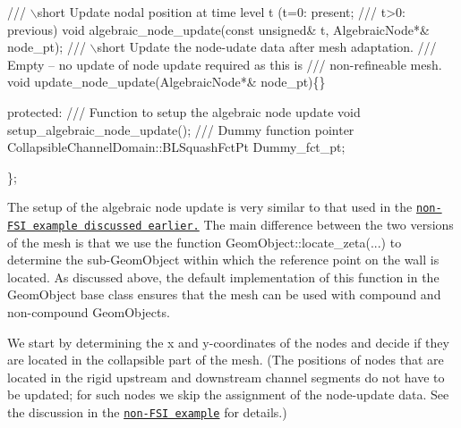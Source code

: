 \begin{DoxyCodeInclude}
 \textcolor{comment}{/// \(\backslash\)short Update nodal position at time level t (t=0: present; }
\textcolor{comment}{ /// t>0: previous)}
\textcolor{comment}{} \textcolor{keywordtype}{void} algebraic\_node\_update(\textcolor{keyword}{const} \textcolor{keywordtype}{unsigned}& t, AlgebraicNode*& node\_pt);
 \textcolor{comment}{}
\textcolor{comment}{ /// \(\backslash\)short Update the node-udate data after mesh adaptation.}
\textcolor{comment}{ /// Empty -- no update of node update required as this is }
\textcolor{comment}{ /// non-refineable mesh.}
\textcolor{comment}{} \textcolor{keywordtype}{void} update\_node\_update(AlgebraicNode*& node\_pt)\{\}

\textcolor{keyword}{protected}:
\textcolor{comment}{}
\textcolor{comment}{ /// Function to setup the algebraic node update}
\textcolor{comment}{} \textcolor{keywordtype}{void} setup\_algebraic\_node\_update();
\textcolor{comment}{}
\textcolor{comment}{ /// Dummy function pointer }
\textcolor{comment}{} CollapsibleChannelDomain::BLSquashFctPt Dummy\_fct\_pt;

\};

\end{DoxyCodeInclude}


The setup of the algebraic node update is very similar to that used in the \href{../../../navier_stokes/algebraic_collapsible_channel/html/index.html}{\tt non-\/\+F\+SI example discussed earlier.} The main difference between the two versions of the mesh is that we use the function {\ttfamily Geom\+Object\+::locate\+\_\+zeta}(...) to determine the sub-\/{\ttfamily Geom\+Object} within which the reference point on the wall is located. As discussed above, the default implementation of this function in the {\ttfamily Geom\+Object} base class ensures that the mesh can be used with compound and non-\/compound {\ttfamily Geom\+Objects}.

We start by determining the x and y-\/coordinates of the nodes and decide if they are located in the collapsible part of the mesh. (The positions of nodes that are located in the rigid upstream and downstream channel segments do not have to be updated; for such nodes we skip the assignment of the node-\/update data. See the discussion in the \href{../../../navier_stokes/algebraic_collapsible_channel/html/index.html}{\tt non-\/\+F\+SI example} for details.)

